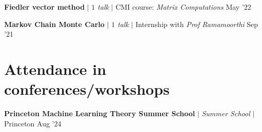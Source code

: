 

\resumeProjectHeading
{\textbf{Fiedler vector method} $|$ \emph{$1$ talk} $|$ CMI course: \textit{Matrix Computations}}
{May '22}
{}
\vspace{\mygap}

%

\resumeProjectHeading
{\textbf{Markov Chain Monte Carlo} $|$ \emph{$1$ talk} $|$ Internship with \textit{Prof Ramamoorthi}}
{Sep '21}
{}
%
%
%
%
\resumeSubHeadingListEnd

\vspace{-25pt}


\section{Attendance in conferences/workshops}
\resumeSubHeadingListStart


\resumeProjectHeading
{\textbf{Princeton Machine Learning Theory Summer School} $|$ \textit{Summer School} $|$ Princeton}
{Aug '24}
{}
\vspace{\mygap}

